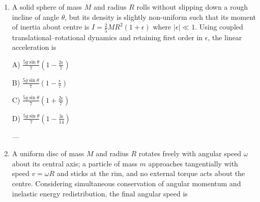 \documentclass[12pt]{article}
\begin{document}
\begin{enumerate}[leftmargin=*]
C) \(\dfrac{J^2}{mL^2}\)  

D) \(\dfrac{27J^2}{16mL^2}\)  

---

\item A solid sphere of mass \(M\) and radius \(R\) rolls without slipping down a rough incline of angle \(\theta\), but its density is slightly non-uniform such that its moment of inertia about centre is \(I=\frac{2}{5}MR^2(1+\epsilon)\) where \(|\epsilon|\ll1\). Using coupled translational–rotational dynamics and retaining first order in \(\epsilon\), the linear acceleration is  


\begin{center}
\end{center}

A) \(\frac{5g\sin\theta}{7}\left(1-\frac{2\epsilon}{7}\right)\)  

B) \(\frac{5g\sin\theta}{7}\left(1-\frac{\epsilon}{7}\right)\)  

C) \(\frac{5g\sin\theta}{7}\left(1+\frac{2\epsilon}{7}\right)\)  

D) \(\frac{5g\sin\theta}{7}\left(1-\frac{3\epsilon}{14}\right)\)  

---

\item A uniform disc of mass \(M\) and radius \(R\) rotates freely with angular speed \(\omega\) about its central axis; a particle of mass \(m\) approaches tangentially with speed \(v=\omega R\) and sticks at the rim, and no external torque acts about the centre. Considering simultaneous conservation of angular momentum and inelastic energy redistribution, the final angular speed is  


\begin{center}
\begin{tikzpicture}[scale=1.1]


\end{tikzpicture}
\end{center}
\end{enumerate}
\end{document}
